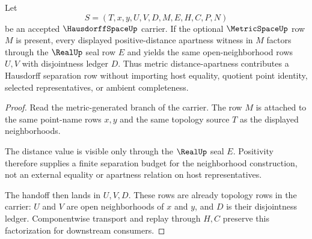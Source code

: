\begin{theorem}
\label{thm:hausdorff-space-metric-separation-handoff}
Let
$$
S=(T,x,y,U,V,D,M,E,H,C,P,N)
$$
be an accepted $\HausdorffSpaceUp$ carrier. If the optional $\MetricSpaceUp$ row $M$ is present, every displayed positive-distance apartness witness in $M$ factors through the $\RealUp$ seal row $E$ and yields the same open-neighborhood rows $U,V$ with disjointness ledger $D$. Thus metric distance-apartness contributes a Hausdorff separation row without importing host equality, quotient point identity, selected representatives, or ambient completeness.
\end{theorem}
\begin{proof}
Read the metric-generated branch of the carrier. The row $M$ is attached to the same point-name rows $x,y$ and the same topology source $T$ as the displayed neighborhoods.

The distance value is visible only through the $\RealUp$ seal $E$. Positivity therefore supplies a finite separation budget for the neighborhood construction, not an external equality or apartness relation on host representatives.

The handoff then lands in $U,V,D$. These rows are already topology rows in the carrier: $U$ and $V$ are open neighborhoods of $x$ and $y$, and $D$ is their disjointness ledger. Componentwise transport and replay through $H,C$ preserve this factorization for downstream consumers.
\end{proof}

